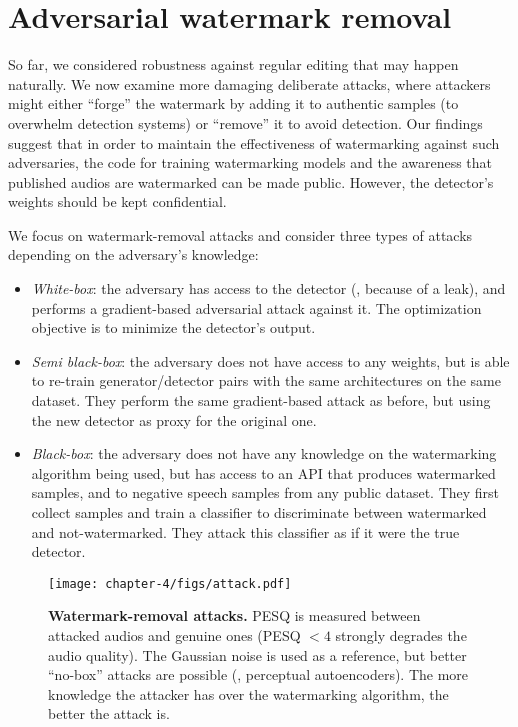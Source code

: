 
\section{Adversarial watermark removal}
\label{chap4/sec:attacks}


So far, we considered robustness against regular editing that may happen naturally.
We now examine more damaging deliberate attacks, where attackers might either ``forge'' the watermark by adding it to authentic samples (to overwhelm detection systems) or ``remove'' it to avoid detection. 
Our findings suggest that in order to maintain the effectiveness of watermarking against such adversaries, the code for training watermarking models and the awareness that published audios are watermarked can be made public. 
However, the detector's weights should be kept confidential.

We focus on watermark-removal attacks and consider three types of attacks depending on the adversary's knowledge:
\begin{itemize}
    \item \textit{White-box}: 
    the adversary has access to the detector (\eg, because of a leak), and performs a gradient-based adversarial attack against it.
    The optimization objective is to minimize the detector's output.
    \item \textit{Semi black-box}: 
    the adversary does not have access to any weights, but is able to re-train generator/detector pairs with the same architectures on the same dataset.
    They perform the same gradient-based attack as before, but using the new detector as proxy for the original one.
    \item \textit{Black-box}: 
    the adversary does not have any knowledge on the watermarking algorithm being used, but has access to an API that produces watermarked samples, and to negative speech samples from any public dataset.
    They first collect samples and train a classifier to discriminate between watermarked and not-watermarked.
    They attack this classifier as if it were the true detector.
\end{itemize}


\begin{figure}[b!]
    \centering
    \texttt{[image: chapter-4/figs/attack.pdf]}
    \caption{
    \textbf{Watermark-removal attacks.} 
    PESQ is measured between attacked audios and genuine ones (PESQ $<4$ strongly degrades the audio quality).
    The Gaussian noise is used as a reference, but better ``no-box'' attacks are possible (\eg, perceptual autoencoders).
    The more knowledge the attacker has over the watermarking algorithm, the better the attack is.
    }
    \label{chap4/fig:attacks}
\end{figure}

